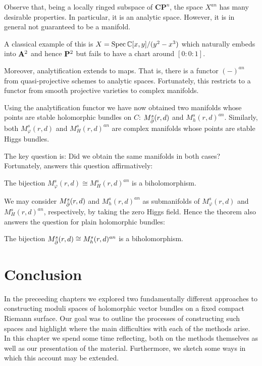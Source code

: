\documentclass[12pt]{ociamthesis}  %
\begin{document}
Observe that, being a locally ringed subspace of $\mathbf{CP}^n$,
the space $X^{an}$ has many desirable properties. In particular, it is
an analytic space. However, it is in general not guaranteed to
be a manifold.

\begin{example}
  A classical example of this is $X=\operatorname{Spec} \mathbb C[x,y]/(y^2-x^3)$
  which naturally embeds into $\mathbf{A}^{2}_{}$ and hence $\mathbf{P}^{2}_{}$
  but fails to have a chart around $[0:0:1]$.
\end{example}

Moreover, analytification extends to maps. That is, there is a
functor $(-)^{an}$ from quasi-projective schemes to analytic spaces.
Fortunately, this restricts to a functor from smooth projective varieties
to complex manifolds.

Using the analytification functor we have now obtained two
manifolds whose points are stable holomorphic bundles on $C$:
$M^s_{\bar{\partial}}(r,d)$ and $M^s_h(r,d)^{an}$. Similarly,
both $M^s_\varphi(r,d)$ and $M^s_H(r,d)^{an}$ are complex manifolds
whose points are stable Higgs bundles.

The key question is: Did we obtain the same manifolds in both cases?
Fortunately, \cite[Theorem C]{fan2020} answers this question affirmatively:

\begin{theorem}
  The bijection
  $M^s_\varphi(r,d) \cong M^s_H(r,d)^{an}$
  is a biholomorphism.
\end{theorem}

We may consider $M^s_{\bar{\partial}}(r,d)$ and $M^s_h(r,d)^{an}$ as submanifolds
of $M^s_\varphi(r,d)$ and $M^s_H(r,d)^{an}$, respectively, by taking
the zero Higgs field. Hence the theorem also answers the question for plain
holomorphic bundles:

\begin{corollary}
  The bijection
  $M^s_{\bar{\partial}}(r,d) \cong M^s_h(r,d)^{an}$
  is a biholomorphism.
\end{corollary}

\chapter{Conclusion}

In the preceeding chapters we explored two fundamentally different
approaches to constructing moduli spaces of holomorphic vector
bundles on a fixed compact Riemann surface. Our goal was to
outline the processes of constructing such spaces and highlight where
the main difficulties with each of the methods arise.
In this chapter we spend some time reflecting, both on the methods
themselves as well as our presentation of the material.
Furthermore, we sketch some ways in which this account may be
extended.
\end{document}
